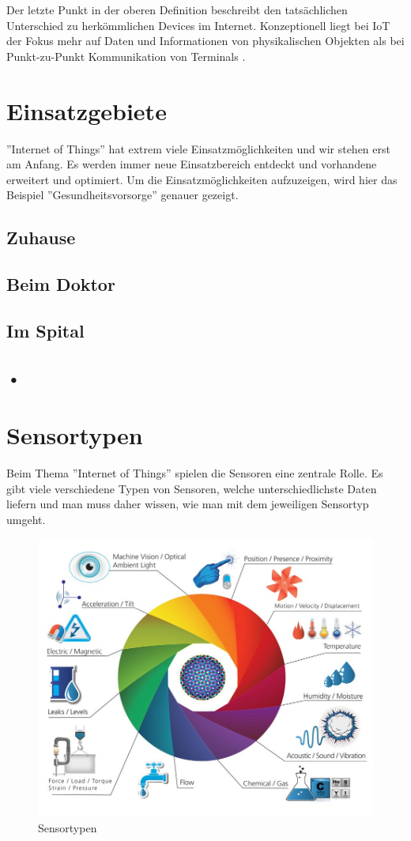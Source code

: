 Der letzte Punkt in der oberen Definition beschreibt den tatsächlichen Unterschied zu herkömmlichen Devices im Internet. Konzeptionell liegt bei IoT der Fokus mehr auf Daten und Informationen von physikalischen Objekten als bei Punkt-zu-Punkt Kommunikation von Terminals \cite{MiorandiSicariPellegriniChlamtac12}.

\section{Einsatzgebiete}
''Internet of Things'' hat extrem viele Einsatzmöglichkeiten und wir stehen erst am Anfang. Es werden immer neue Einsatzbereich entdeckt und vorhandene erweitert und optimiert. Um die Einsatzmöglichkeiten aufzuzeigen, wird hier das Beispiel ''Gesundheitsvorsorge'' genauer gezeigt.
\subsection{Zuhause}
\subsection{Beim Doktor}
\subsection{Im Spital}
\subsection{•}
\section{Sensortypen}
Beim Thema ''Internet of Things'' spielen die Sensoren eine zentrale Rolle. Es gibt viele verschiedene Typen von Sensoren, welche unterschiedlichste Daten liefern und man muss daher wissen, wie man mit dem jeweiligen Sensortyp umgeht. 
\begin{figure}[H]
\centering
\includegraphics[scale=0.35]{images/sensors.jpg}
\caption{Sensortypen\cite{SensorImage}}
\end{figure}

